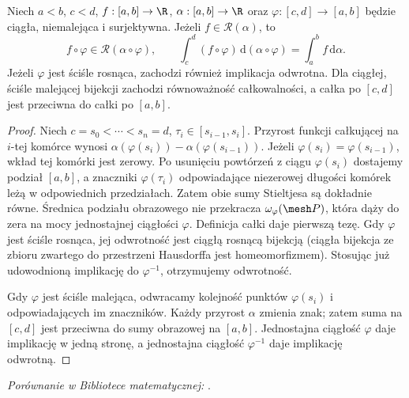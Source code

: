\begin{twierdzenie}\label{it:thm:rs-reparametrization}
Niech $a<b$, $c<d$, $f:[a,b]\to\R$, $\alpha:[a,b]\to\R$ oraz
$\varphi:[c,d]\to[a,b]$ będzie ciągła, niemalejąca i surjektywna.
Jeżeli $f\in\mathcal R(\alpha)$, to
\[
 f\circ\varphi\in\mathcal R(\alpha\circ\varphi),\qquad
 \int_c^d(f\circ\varphi)\,\mathrm d(\alpha\circ\varphi)
 =\int_a^b f\,\mathrm d\alpha.
\]
Jeżeli $\varphi$ jest ściśle rosnąca, zachodzi również implikacja odwrotna.
Dla ciągłej, ściśle malejącej bijekcji zachodzi równoważność
całkowalności, a całka po $[c,d]$ jest przeciwna do całki po $[a,b]$.
\end{twierdzenie}
\begin{proof}
Niech $c=s_0<\cdots<s_n=d$, $\tau_i\in[s_{i-1},s_i]$.
Przyrost funkcji całkującej na $i$-tej komórce wynosi
$\alpha(\varphi(s_i))-\alpha(\varphi(s_{i-1}))$.
Jeżeli $\varphi(s_i)=\varphi(s_{i-1})$, wkład tej komórki jest zerowy.
Po usunięciu powtórzeń z ciągu $\varphi(s_i)$ dostajemy podział
$[a,b]$, a znaczniki $\varphi(\tau_i)$ odpowiadające niezerowej
długości komórek leżą w odpowiednich przedziałach. Zatem obie sumy
Stieltjesa są dokładnie równe. Średnica podziału obrazowego nie
przekracza $\omega_\varphi(\mesh P)$, która dąży do zera na mocy
jednostajnej ciągłości $\varphi$. Definicja całki daje pierwszą tezę.
Gdy $\varphi$ jest ściśle rosnąca, jej odwrotność jest ciągłą rosnącą
bijekcją (ciągła bijekcja ze zbioru zwartego do przestrzeni Hausdorffa
jest homeomorfizmem). Stosując już udowodnioną implikację do
$\varphi^{-1}$, otrzymujemy odwrotność.

Gdy $\varphi$ jest ściśle malejąca, odwracamy kolejność punktów
$\varphi(s_i)$ i odpowiadających im znaczników. Każdy przyrost
$\alpha$ zmienia znak; zatem suma na $[c,d]$ jest przeciwna do
sumy obrazowej na $[a,b]$. Jednostajna ciągłość $\varphi$ daje
implikację w jedną stronę, a jednostajna ciągłość $\varphi^{-1}$
daje implikację odwrotną.
\end{proof}

\noindent\emph{Porównanie w Bibliotece matematycznej:} .

